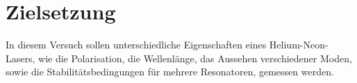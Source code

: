 \section{Zielsetzung}

    \raggedright

    In diesem Versuch sollen unterschiedliche Eigenschaften eines Helium-Neon-Lasers,
    wie die Polarisation, die Wellenlänge, das Aussehen verschiedener Moden, sowie die Stabilitätsbedingungen
    für mehrere Resonatoren, gemessen werden.
